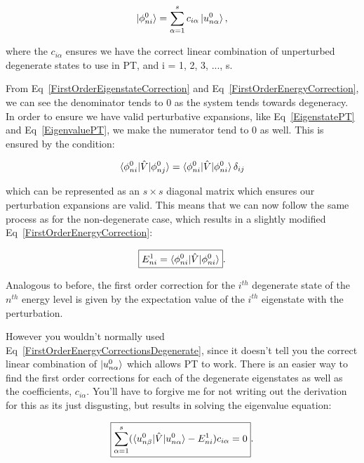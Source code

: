 \begin{equation}
    \ket{\phi^0_{ni}} = \sum^s_{\alpha = 1} c_{i\alpha} \ket{u^0_{n \alpha}}
    \label{LinearCombinationDegenerateStates},
\end{equation}

\noindent where the $c_{i\alpha}$ ensures we have the correct linear combination of unperturbed degenerate states to use in PT, and i = 1, 2, 3, ..., s.

\noindent From Eq~\ref{FirstOrderEigenstateCorrection} and Eq~\ref{FirstOrderEnergyCorrection}, we can see the denominator tends to 0 as the system tends towards degeneracy. In order to ensure we have valid perturbative expansions, like Eq~\ref{EigenstatePT} and Eq~\ref{EigenvaluePT}, we make the numerator tend to 0 as well. This is ensured by the condition:

\begin{equation}
    \braket{\phi^0_{ni} | \Hat{V} | \phi^0_{nj}} = \braket{\phi^0_{ni} | \Hat{V} | \phi^0_{ni}} \delta_{ij}
    \label{MatrixCondition}
\end{equation}

\noindent which can be represented as an $s \times s$ diagonal matrix which ensures our perturbation expansions are valid. This means that we can now follow the same process as for the non-degenerate case, which results in a slightly modified Eq~\ref{FirstOrderEnergyCorrection}:

\begin{equation}
    \boxed{E^1_{ni} = \braket{\phi^0_{ni} | \Hat{V} | \phi^0_{ni}}}.
    \label{FirstOrderEnergyCorrectionsDegenerate}
\end{equation}

\noindent Analogous to before, the first order correction for the $i^{th}$ degenerate state of the $n^{th}$ energy level is given by the expectation value of the $i^{th}$ eigenstate with the perturbation.

\noindent However you wouldn't normally used Eq~\ref{FirstOrderEnergyCorrectionsDegenerate}, since it doesn't tell you the correct linear combination of $\ket{u^0_{n \alpha}}$ which allows PT to work. There is an easier way to find the first order corrections for each of the degenerate eigenstates as well as the coefficients, $c_{i \alpha}$. You'll have to forgive me for not writing out the derivation for this as its just disgusting, but results in solving the eigenvalue equation:

\begin{equation}
    \boxed{\sum^s_{\alpha = 1} (\braket{u^0_{n\beta} | \Hat{V} | u^0_{n\alpha}} - E^1_{ni} )c_{i \alpha} = 0}.
    \label{DegenerateMatrixEquation}
\end{equation}

